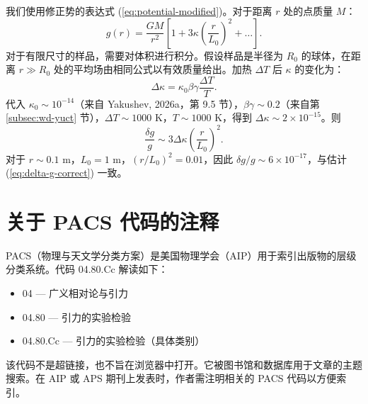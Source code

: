 \documentclass[12pt]{article}
\theoremstyle{remark}
\begin{document}
	我们使用修正势的表达式 (\ref{eq:potential-modified})。对于距离 $r$ 处的点质量 $M$：
	\begin{equation}
		g(r) = \frac{GM}{r^2} \left[ 1 + 3\kappa \left( \frac{r}{L_0} \right)^2 + \dots \right].
		\label{eq:g-modified}
	\end{equation}
	对于有限尺寸的样品，需要对体积进行积分。假设样品是半径为 $R_0$ 的球体，在距离 $r \gg R_0$ 处的平均场由相同公式以有效质量给出。加热 $\Delta T$ 后 $\kappa$ 的变化为：
	\begin{equation}
		\Delta\kappa = \kappa_0 \beta\gamma \frac{\Delta T}{T}.
		\label{eq:delta-kappa}
	\end{equation}
	代入 $\kappa_0 \sim 10^{-14}$（来自 Yakushev, 2026a，第 9.5 节），$\beta\gamma \sim 0.2$（来自第 \ref{subsec:wd-yuct} 节），$\Delta T \sim 1000$ K，$T \sim 1000$ K，得到 $\Delta\kappa \sim 2\times10^{-15}$。则
	\begin{equation}
		\frac{\delta g}{g} \sim 3\Delta\kappa \left( \frac{r}{L_0} \right)^2.
		\label{eq:delta-g-final}
	\end{equation}
	对于 $r \sim 0.1$ m，$L_0 = 1$ m，$(r/L_0)^2 = 0.01$，因此 $\delta g/g \sim 6\times10^{-17}$，与估计 (\ref{eq:delta-g-correct}) 一致。
	
	\section{关于 PACS 代码的注释}
	\label{app:pacs}
	
	PACS（物理与天文学分类方案）是美国物理学会（AIP）用于索引出版物的层级分类系统。代码 04.80.Cc 解读如下：
	\begin{itemize}
		\item 04 — 广义相对论与引力
		\item 04.80 — 引力的实验检验
		\item 04.80.Cc — 引力的实验检验（具体类别）
	\end{itemize}
	该代码不是超链接，也不旨在浏览器中打开。它被图书馆和数据库用于文章的主题搜索。在 AIP 或 APS 期刊上发表时，作者需注明相关的 PACS 代码以方便索引。
	
\end{document}
